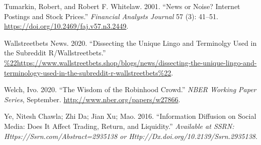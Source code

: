 \documentclass[12pt,]{article}
\begin{document}
\leavevmode\hypertarget{ref-tumarkin2001}{}%
Tumarkin, Robert, and Robert F. Whitelaw. 2001. ``News or Noise?
Internet Postings and Stock Prices.'' \emph{Financial Analysts Journal}
57 (3): 41--51. \url{https://doi.org/10.2469/faj.v57.n3.2449}.

\leavevmode\hypertarget{ref-wsbshop}{}%
Wallstreetbets News. 2020. ``Dissecting the Unique Lingo and Terminolgy
Used in the Subreddit R/Wallstreetbets.''
\url{\%22https://www.wallstreetbets.shop/blogs/news/dissecting-the-unique-lingo-and-terminology-used-in-the-subreddit-r-wallstreetbets\%22}.

\leavevmode\hypertarget{ref-welch2020}{}%
Welch, Ivo. 2020. ``The Wisdom of the Robinhood Crowd.'' \emph{NBER
Working Paper Series}, September.
\url{http://www.nber.org/papers/w27866}.

\leavevmode\hypertarget{ref-chawla2016}{}%
Ye, Nitesh Chawla; Zhi Da; Jian Xu; Mao. 2016. ``Information Diffusion
on Social Media: Does It Affect Trading, Return, and Liquidity.''
\emph{Available at SSRN: Https://Ssrn.com/Abstract=2935138 or
Http://Dx.doi.org/10.2139/Ssrn.2935138}.





\newpage
\singlespacing 
\end{document}
